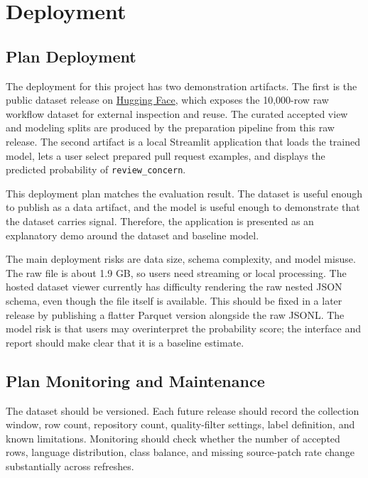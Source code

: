 \section{Deployment}

\subsection{Plan Deployment}

The deployment for this project has two demonstration artifacts. The first is the public dataset release on \href{https://huggingface.co/datasets/bulatSharif/gh-pr-issue-traces-10k}{Hugging Face}, which exposes the 10,000-row raw workflow dataset for external inspection and reuse. The curated accepted view and modeling splits are produced by the preparation pipeline from this raw release. The second artifact is a local Streamlit application that loads the trained model, lets a user select prepared pull request examples, and displays the predicted probability of \texttt{review\_concern}.

This deployment plan matches the evaluation result. The dataset is useful enough to publish as a data artifact, and the model is useful enough to demonstrate that the dataset carries signal. Therefore, the application is presented as an explanatory demo around the dataset and baseline model.

The main deployment risks are data size, schema complexity, and model misuse. The raw file is about 1.9 GB, so users need streaming or local processing. The hosted dataset viewer currently has difficulty rendering the raw nested JSON schema, even though the file itself is available. This should be fixed in a later release by publishing a flatter Parquet version alongside the raw JSONL. The model risk is that users may overinterpret the probability score; the interface and report should make clear that it is a baseline estimate.

\subsection{Plan Monitoring and Maintenance}

The dataset should be versioned. Each future release should record the collection window, row count, repository count, quality-filter settings, label definition, and known limitations. Monitoring should check whether the number of accepted rows, language distribution, class balance, and missing source-patch rate change substantially across refreshes.

